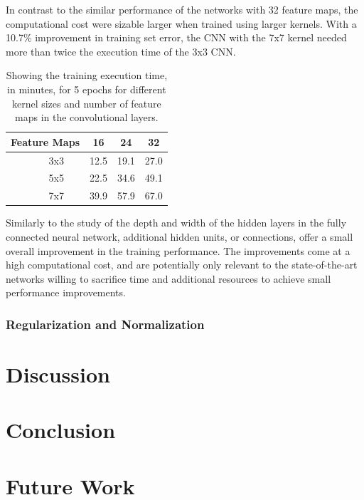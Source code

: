 \documentclass[]{article}
\newcommand*\rot{\rotatebox{90}}
\begin{document}
In contrast to the similar performance of the networks with 32 feature maps, the computational cost were sizable larger when trained using larger kernels. With a 10.7\% improvement in training set error, the CNN with the 7x7 kernel needed more than twice the execution time of the 3x3 CNN.

\begin{table}[h]
	\centering
	\caption{Showing the training execution time, in minutes, for 5 epochs for different kernel sizes and number of feature maps in the convolutional layers.}
	\label{filter-res}
	\begin{tabular}{@{}ccccc@{}}
		\toprule
		\multicolumn{2}{c}{Feature Maps} & 16 & 24 & 32 \\ \midrule
		\multirow{3}{*}{\rot{Size}} & \multicolumn{1}{c|}{3x3} & 12.5 & 19.1 & 27.0 \\
		& \multicolumn{1}{c|}{5x5} & 22.5 & 34.6 & 49.1 \\
		& \multicolumn{1}{c|}{7x7} & 39.9 & 57.9 & 67.0 \\ \bottomrule
	\end{tabular}
\end{table}

Similarly to the study of the depth and width of the hidden layers in the fully connected neural network, additional hidden units, or connections, offer a small overall improvement in the training performance. The improvements come at a high computational cost, and are potentially only relevant to the state-of-the-art networks willing to sacrifice time and additional resources to achieve small performance improvements. 

\subsubsection{Regularization and Normalization}



\section{Discussion}


\section{Conclusion}

\section{Future Work}


\clearpage
\medskip


\end{document}
